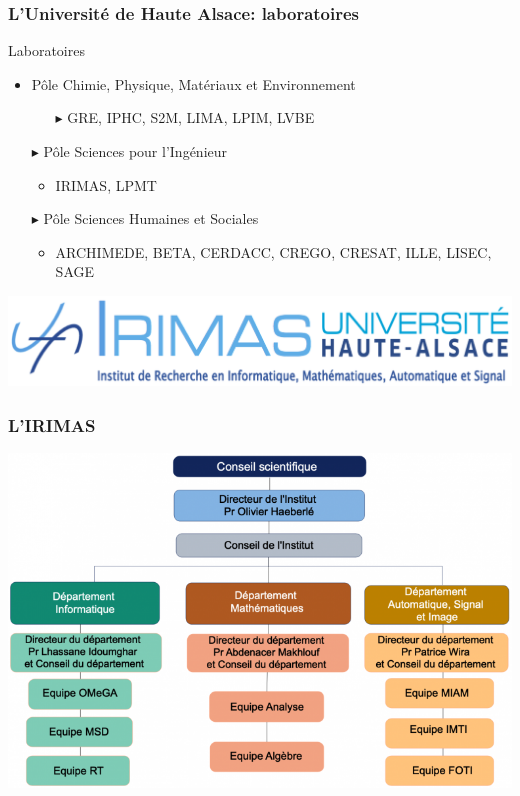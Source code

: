 \documentclass[11pt]{beamer}
\begin{document}
		\begin{frame}[t]
			\frametitle{L'Université de Haute Alsace: laboratoires}
			\begin{block}{Laboratoires}
				\begin{itemize}
					\item Pôle Chimie, Physique, Matériaux et Environnement
						\begin{itemize}
							\item[\(\blacktriangleright\)] GRE, IPHC, S2M, LIMA, LPIM, LVBE
						\end{itemize}
					\item[\(\blacktriangleright\)] Pôle Sciences pour l'Ingénieur
						\begin{itemize}
							\item IRIMAS, LPMT
						\end{itemize}
					\item[\(\blacktriangleright\)] Pôle Sciences Humaines et Sociales
						\begin{itemize}
							\item ARCHIMEDE, BETA, CERDACC, CREGO, CRESAT, ILLE, LISEC, SAGE
						\end{itemize}
				\end{itemize}
			\end{block}
			\centering
			\vspace{7.5pt}
			\includegraphics[width=\linewidth]{IRIMAS}
		\end{frame}
		\begin{frame}
			\frametitle{L'IRIMAS}
			\centering
			\includegraphics[width=0.9\linewidth]{irimas_organigramme}
		\end{frame}
\end{document}
